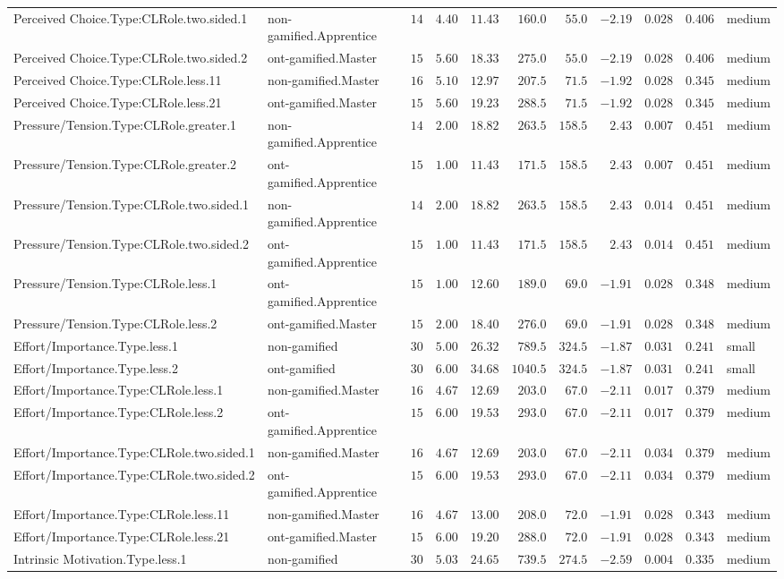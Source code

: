 \documentclass[6pt,a4paper]{article}
\begin{document}
\begin{landscape}
{\begin{longtable}{llrrrrrrrrl}
Perceived Choice.Type:CLRole.two.sided.1&non-gamified.Apprentice&$14$&$4.40$&$11.43$&$ 160.0$&$ 55.0$&$-2.19$&$0.028$&$0.406$&medium\tabularnewline
Perceived Choice.Type:CLRole.two.sided.2&ont-gamified.Master&$15$&$5.60$&$18.33$&$ 275.0$&$ 55.0$&$-2.19$&$0.028$&$0.406$&medium\tabularnewline
Perceived Choice.Type:CLRole.less.11&non-gamified.Master&$16$&$5.10$&$12.97$&$ 207.5$&$ 71.5$&$-1.92$&$0.028$&$0.345$&medium\tabularnewline
Perceived Choice.Type:CLRole.less.21&ont-gamified.Master&$15$&$5.60$&$19.23$&$ 288.5$&$ 71.5$&$-1.92$&$0.028$&$0.345$&medium\tabularnewline
Pressure/Tension.Type:CLRole.greater.1&non-gamified.Apprentice&$14$&$2.00$&$18.82$&$ 263.5$&$158.5$&$ 2.43$&$0.007$&$0.451$&medium\tabularnewline
Pressure/Tension.Type:CLRole.greater.2&ont-gamified.Apprentice&$15$&$1.00$&$11.43$&$ 171.5$&$158.5$&$ 2.43$&$0.007$&$0.451$&medium\tabularnewline
Pressure/Tension.Type:CLRole.two.sided.1&non-gamified.Apprentice&$14$&$2.00$&$18.82$&$ 263.5$&$158.5$&$ 2.43$&$0.014$&$0.451$&medium\tabularnewline
Pressure/Tension.Type:CLRole.two.sided.2&ont-gamified.Apprentice&$15$&$1.00$&$11.43$&$ 171.5$&$158.5$&$ 2.43$&$0.014$&$0.451$&medium\tabularnewline
Pressure/Tension.Type:CLRole.less.1&ont-gamified.Apprentice&$15$&$1.00$&$12.60$&$ 189.0$&$ 69.0$&$-1.91$&$0.028$&$0.348$&medium\tabularnewline
Pressure/Tension.Type:CLRole.less.2&ont-gamified.Master&$15$&$2.00$&$18.40$&$ 276.0$&$ 69.0$&$-1.91$&$0.028$&$0.348$&medium\tabularnewline
Effort/Importance.Type.less.1&non-gamified&$30$&$5.00$&$26.32$&$ 789.5$&$324.5$&$-1.87$&$0.031$&$0.241$&small\tabularnewline
Effort/Importance.Type.less.2&ont-gamified&$30$&$6.00$&$34.68$&$1040.5$&$324.5$&$-1.87$&$0.031$&$0.241$&small\tabularnewline
Effort/Importance.Type:CLRole.less.1&non-gamified.Master&$16$&$4.67$&$12.69$&$ 203.0$&$ 67.0$&$-2.11$&$0.017$&$0.379$&medium\tabularnewline
Effort/Importance.Type:CLRole.less.2&ont-gamified.Apprentice&$15$&$6.00$&$19.53$&$ 293.0$&$ 67.0$&$-2.11$&$0.017$&$0.379$&medium\tabularnewline
Effort/Importance.Type:CLRole.two.sided.1&non-gamified.Master&$16$&$4.67$&$12.69$&$ 203.0$&$ 67.0$&$-2.11$&$0.034$&$0.379$&medium\tabularnewline
Effort/Importance.Type:CLRole.two.sided.2&ont-gamified.Apprentice&$15$&$6.00$&$19.53$&$ 293.0$&$ 67.0$&$-2.11$&$0.034$&$0.379$&medium\tabularnewline
Effort/Importance.Type:CLRole.less.11&non-gamified.Master&$16$&$4.67$&$13.00$&$ 208.0$&$ 72.0$&$-1.91$&$0.028$&$0.343$&medium\tabularnewline
Effort/Importance.Type:CLRole.less.21&ont-gamified.Master&$15$&$6.00$&$19.20$&$ 288.0$&$ 72.0$&$-1.91$&$0.028$&$0.343$&medium\tabularnewline
Intrinsic Motivation.Type.less.1&non-gamified&$30$&$5.03$&$24.65$&$ 739.5$&$274.5$&$-2.59$&$0.004$&$0.335$&medium\tabularnewline

\end{longtable}}
\end{landscape}
\end{document}
